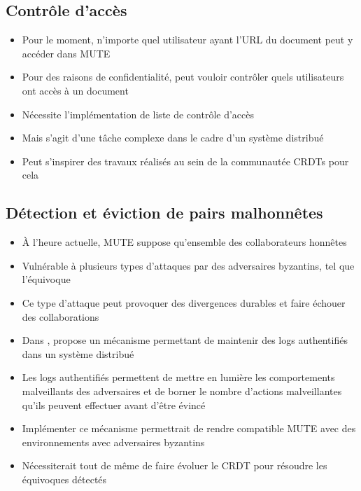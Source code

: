 \documentclass[12pt]{thesul}
\begin{document}
\subsection{Contrôle d'accès}

\begin{itemize}
  \item Pour le moment, n'importe quel utilisateur ayant l'URL du document peut y accéder dans MUTE
  \item Pour des raisons de confidentialité, peut vouloir contrôler quels utilisateurs ont accès à un document
  \item Nécessite l'implémentation de liste de contrôle d'accès
  \item Mais s'agit d'une tâche complexe dans le cadre d'un système distribué
  \item Peut s'inspirer des travaux réalisés au sein de la communautée \acp{CRDT} \cite{2021-access-control-crdts, 2022-dist-access-control-pa} pour cela
\end{itemize}

\subsection{Détection et éviction de pairs malhonnêtes}

\begin{itemize}
  \item À l'heure actuelle, MUTE suppose qu'ensemble des collaborateurs honnêtes
  \item Vulnérable à plusieurs types d'attaques par des adversaires byzantins, tel que l'équivoque
  \item Ce type d'attaque peut provoquer des divergences durables et faire échouer des collaborations
  \item Dans \cite{2018-prunable-authenticated-log, 2021-these-vic}, \citeauthor{2021-these-vic} propose un mécanisme permettant de maintenir des logs authentifiés dans un système distribué
  \item Les logs authentifiés permettent de mettre en lumière les comportements malveillants des adversaires et de borner le nombre d'actions malveillantes qu'ils peuvent effectuer avant d'être évincé
  \item Implémenter ce mécanisme permettrait de rendre compatible MUTE avec des environnements avec adversaires byzantins
  \item Nécessiterait tout de même de faire évoluer le \ac{CRDT} pour résoudre les équivoques détectés
\end{itemize}
\end{document}
